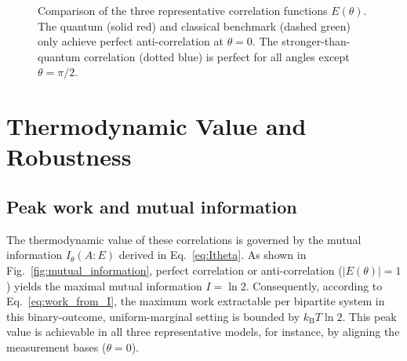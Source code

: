 \documentclass[pra,twocolumn,showpacs,preprintnumbers,amsmath,amssymb,longbibliography,
               superscriptaddress]{revtex4-2}
\begin{document}
\begin{figure}[ht!]
    \centering
{}
    \caption{{Comparison of the three representative correlation
    functions $E(\theta)$.
    The quantum (solid red) and classical benchmark (dashed green)
    only achieve perfect anti-correlation at $\theta=0$.
    The stronger-than-quantum correlation (dotted blue) is perfect for
    all angles except $\theta = \pi/2$.}}
    \label{fig:correlations}
\end{figure}

\section{Thermodynamic Value and Robustness}
\label{sec:thermo_value}

\subsection{{Peak work and mutual information}}

The thermodynamic value of these correlations is {governed} by the mutual
information $I_\theta(A{:}E)$ {derived in Eq.~\eqref{eq:Itheta}}.
As shown in Fig.~\ref{fig:mutual_information}, perfect correlation or
anti-correlation ($|E(\theta)|=1$) yields the maximal mutual
information $I=\ln 2$.
Consequently, according to Eq.~\eqref{eq:work_from_I}, the maximum
work extractable per bipartite system {in this binary-outcome,
uniform-marginal setting} is bounded by
$k_{\mathrm{B}}T\ln 2$.
This peak value is achievable in all three {representative} models, for
instance, by aligning the measurement bases ($\theta=0$).
\end{document}
